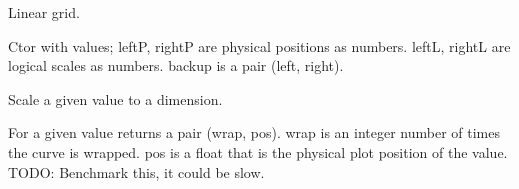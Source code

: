 \documentclass[letterpaper,10pt,english]{sphinxmanual}
\begin{document}

\begin{fulllineitems}
\label{\detokenize{ref/util/plot/PRESCfg:TotalDepth.util.plot.PRESCfg.LineTransLin}}
Linear grid.

\begin{fulllineitems}
\label{\detokenize{ref/util/plot/PRESCfg:TotalDepth.util.plot.PRESCfg.LineTransLin.__init__}}
Ctor with values; leftP, rightP are physical positions as numbers.
leftL, rightL are logical scales as numbers.
backup is a pair (left, right).

\end{fulllineitems}


\begin{fulllineitems}
\label{\detokenize{ref/util/plot/PRESCfg:TotalDepth.util.plot.PRESCfg.LineTransLin.L2P}}
Scale a given value to a dimension.

\end{fulllineitems}


\begin{fulllineitems}
\label{\detokenize{ref/util/plot/PRESCfg:TotalDepth.util.plot.PRESCfg.LineTransLin.wrapPos}}
For a given value returns a pair (wrap, pos).
wrap is an integer number of times the curve is wrapped.
pos is a float that is the physical plot position of the value.
TODO: Benchmark this, it could be slow.

\end{fulllineitems}


\end{fulllineitems}

\end{document}
